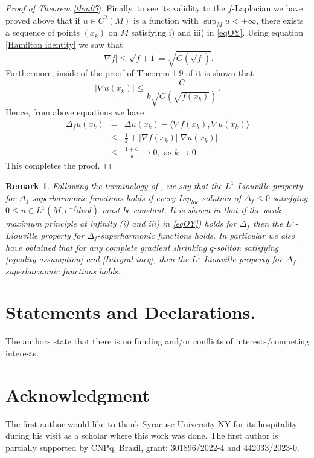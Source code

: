 \documentclass{amsart}
\theoremstyle{plain}
\newtheorem{remark}[theorem]{Remark}
\numberwithin{equation}{section}
\begin{document}
\begin{proof}[Proof of Theorem \ref{thm07}]
Finally, to see its validity to the $f$-Laplacian we have proved above that if $u\in C^2(M)$ is a function with $\sup_Mu<+\infty$, there exists a  sequence of points $(x_k)$ on $M$ satisfying i) and iii) in \eqref{eqOY}. Using equation \eqref{Hamilton identity} we saw that 
$$|\nabla f|\leq\sqrt{f+1}=\sqrt{G(\sqrt{f})}.$$
Furthermore, inside of the proof of Theorem 1.9 of \cite{PRS-Memoirs} it is shown that 
$$|\nabla u(x_k)|\leq\frac{C}{k\sqrt{G(\sqrt{f(x_k)})}}.$$
Hence, from above equations we have
\begin{eqnarray*}
  \Delta_fu(x_k) &=& \Delta u(x_k)-\langle\nabla f(x_k),\nabla u(x_k)\rangle\\
  &\leq& \frac{1}{k}+|\nabla f(x_k)||\nabla u(x_k)|\\
  &\leq&\frac{1+C}{k}\to0,\,\,\text{as}\,\,k\to0.
\end{eqnarray*}
This completes the proof.
\end{proof}

\begin{remark}
{\em 
Following the terminology of \cite{PRS}, we say that the $L^1$-Liouville property for $\Delta_f$-superharmonic functions holds if every $Lip_{loc}$ solution of $\Delta_f\leq0$ satisfying $0\leq u\in L^1(M,e^{-f}dvol)$ must be constant. It is shown in \cite[Theorem 24]{PRS} that if the weak maximum principle at infinity (i) and iii) in \eqref{eqOY}) holds for $\Delta_f$ then the $L^1$-Liouville property for $\Delta_f$-superharmonic functions holds. In particular we also have obtained that for any complete gradient shrinking $q$-soliton satisfying \eqref{equality assumption} and \eqref{Integral ineq}, then the $L^1$-Liouville property for $\Delta_f$-superharmonic functions holds.}
\end{remark}


\section*{Statements and Declarations.} The authors state that there is no funding and/or conflicts of interests/competing interests.

\section*{Acknowledgment}
 The first author would like to thank Syracuse University-NY for its hospitality during his visit as a scholar where this work was done. The first author is partially supported by CNPq, Brazil, grant: 301896/2022-4 and 442033/2023-0.
\end{document}
